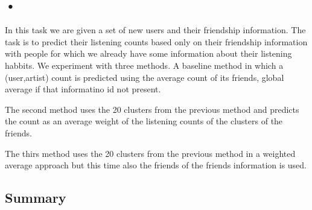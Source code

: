 \subsection{•}
In this task we are given a set of new users and their friendship information.
The task is to predict their listening counts based only on their friendship information with
people for which we already have some information about their listening habbits.
We experiment with three methods.
 A baseline method in which a (user,artist) count is predicted
using the average count of its friends, global average if that informatino id not present.

The second method uses the 20 clusters from the previous method and predicts the count
as an average weight of the listening counts of the clusters of the friends.

The thirs method uses the 20 clusters from the previous method in a weighted average approach but this time also the friends of the friends information is used. 

\subsection{Summary}



